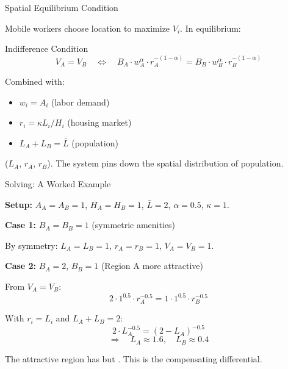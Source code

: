 \documentclass{beamer}
\begin{document}
\begin{frame}{Spatial Equilibrium Condition}

    Mobile workers choose location to maximize $V_i$. In equilibrium:

    \vspace{0.5em}
    \begin{block}{Indifference Condition}
        \vspace{-0.5em}
        \[ V_A = V_B \quad \Longleftrightarrow \quad B_A \cdot w_A^\alpha \cdot r_A^{-(1-\alpha)} = B_B \cdot w_B^\alpha \cdot r_B^{-(1-\alpha)} \]
    \end{block}

    \vspace{0.5em}
    Combined with:
    \begin{itemize}
        \item $w_i = A_i$ (labor demand)
        \item $r_i = \kappa L_i / H_i$ (housing market)
        \item $L_A + L_B = \bar{L}$ (population)
    \end{itemize}

    \vspace{0.5em}
     ($L_A$, $r_A$, $r_B$). The system pins down the spatial distribution of population.

\end{frame}

\begin{frame}{Solving: A Worked Example}

    \textbf{Setup:} $A_A = A_B = 1$, $H_A = H_B = 1$, $\bar{L} = 2$, $\alpha = 0.5$, $\kappa = 1$.

    \vspace{0.3em}
    \textbf{Case 1:} $B_A = B_B = 1$ (symmetric amenities)

    By symmetry: $L_A = L_B = 1$, $r_A = r_B = 1$, $V_A = V_B = 1$.

    \vspace{0.3em}
    \textbf{Case 2:} $B_A = 2$, $B_B = 1$ (Region A more attractive)

    From $V_A = V_B$:
    \[ 2 \cdot 1^{0.5} \cdot r_A^{-0.5} = 1 \cdot 1^{0.5} \cdot r_B^{-0.5} \]

    With $r_i = L_i$ and $L_A + L_B = 2$:
    \[ 2 \cdot L_A^{-0.5} = (2 - L_A)^{-0.5} \]
    \[ \Rightarrow \quad L_A \approx 1.6, \quad L_B \approx 0.4 \]

    \vspace{0.3em}
     The attractive region has  but . This is the compensating differential.

\end{frame}
\end{document}
